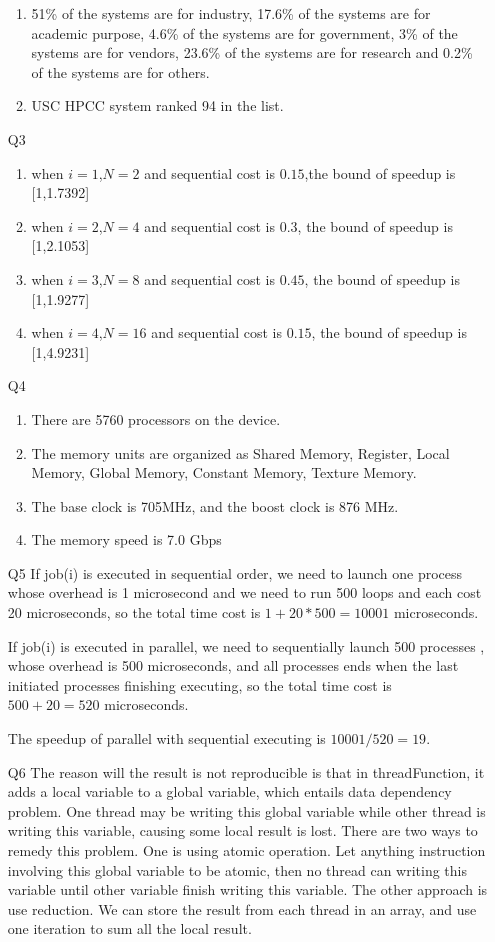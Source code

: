 \documentclass[11pt]{article}
\begin{document}
\begin{enumerate}
\begin{enumerate}
\item 51\% of the systems are for industry,   17.6\% of the systems are for academic purpose, 4.6\% of the systems are for government, 3\% of the systems are for vendors, 23.6\% of the systems are for research and 0.2\% of the systems are for others.
\item USC HPCC system ranked 94 in the list.
\end{enumerate}

\item[Q3]
\begin{enumerate}
\item when $i=1$,$N=2$ and sequential cost is $0.15$,the bound of speedup is [1,1.7392]
\item when $i=2$,$N=4$ and sequential cost is $0.3$, the bound of speedup is [1,2.1053]
\item when $i=3$,$N=8$ and sequential cost is $0.45$, the bound of speedup is [1,1.9277]
\item when $i=4$,$N=16$ and sequential cost is $0.15$, the bound of speedup is [1,4.9231]
\end{enumerate}

\item[Q4]
\begin{enumerate}
\item There are 5760 processors on the device.
\item The memory units are organized as Shared Memory, Register, Local Memory, Global Memory, Constant Memory, Texture Memory.
\item The base clock is 705MHz, and the boost clock is 876 MHz.
\item The memory speed is 7.0 Gbps
\end{enumerate}

\item[Q5]
If job(i) is executed in sequential order, we need to launch one process whose overhead is 1 microsecond and we need to run 500 loops and each cost 20 microseconds, so the total time cost is $1+20*500=10001$ microseconds.

If job(i) is executed in parallel, we need to sequentially launch 500 processes , whose overhead is 500 microseconds, and all processes ends when the last initiated processes finishing executing, so the total time cost is $500+20=520$ microseconds.

The speedup of parallel with sequential executing is $10001/520 = 19$. 

\item[Q6]
The reason will the result is not reproducible is that in threadFunction, it adds a local variable to a global variable, which entails data dependency problem. One thread may be writing this global variable while other thread is writing this variable, causing some local result is lost. There are two ways to remedy this problem. One is using atomic operation. Let anything instruction involving this global variable to be atomic, then no thread can writing this variable until other variable finish writing this variable. The other approach is use reduction. We can store the result from each thread in an array, and use one iteration to sum all the local result.

\end{enumerate}
\end{document}

